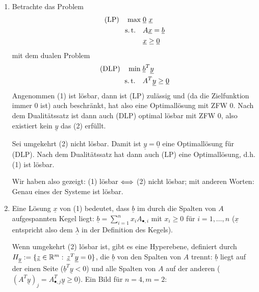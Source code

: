 \documentclass[11pt,german,a4paper,parskip=half-]{scrartcl}
\renewcommand{\u}[1]{\ensuremath{\underline{#1}}} %
\begin{document}
\begin{solution}
\begin{enumerate}
 \item Betrachte das Problem
\begin{align*}
 \text{(LP)}\quad\max\;&\u 0\ \u x\\
\st\quad&A\u x  = \u b\\
&\u x\geq \u 0
\end{align*}
mit dem dualen Problem
\begin{align*}
 \text{(DLP)}\quad\min\;&\u b^T\u y\\
\st\quad&A^T\u y \geq \u 0
\end{align*}
Angenommen (1) ist lösbar, dann ist (LP) zulässig und (da die Zielfunktion immer $0$ ist) auch beschränkt, hat also eine Optimallösung mit ZFW $0$. Nach dem Dualitätssatz ist dann auch (DLP) optimal lösbar
mit ZFW $0$, also existiert kein $\u y$ das (2) erfüllt.

Sei umgekehrt (2) nicht lösbar. Damit ist $\u y = \u 0$ eine Optimallösung für (DLP). Nach dem Dualitätssatz hat dann auch (LP) eine Optimallösung, d.h. (1) ist lösbar.

Wir haben also gezeigt: (1) lösbar $\Llra$ (2) nicht lösbar; mit anderen Worten: Genau eines der Systeme ist lösbar.
\item Eine Lösung $\u x$ von (1) bedeutet, dass $\u b$ im durch die Spalten von $A$ aufgespannten Kegel liegt: $\u b = \sum_{i=1}^n x_i A_{•,i}$ mit $x_i \geq 0$ für $i=1,\dotsc,n$ ($\u x$ entspricht also
dem $\u \lambda$ in der Definition des Kegels).

Wenn umgekehrt (2) lösbar ist, gibt es eine Hyperebene, definiert durch $H_{\u y} := \{ \u z \in \R^m:\,  \u z^T \u y = 0\}$, die $\u b$ von den Spalten von $A$ trennt: $\u b$ liegt auf der einen Seite ($\u b^T\u y < 0$) und alle Spalten von $A$ auf der anderen ($(A^T \u y)_j = A_{•,j}^T \u y \geq 0$). Ein Bild für $n=4,m=2$:
\begin{center}
\qquad
\begin{tikzpicture}[every node/.style={fill=red,draw,circle,inner sep=0mm,minimum size=1.5mm},scale=.8]


\end{tikzpicture}
\end{center}
\end{enumerate}
\end{solution}
\end{document}
